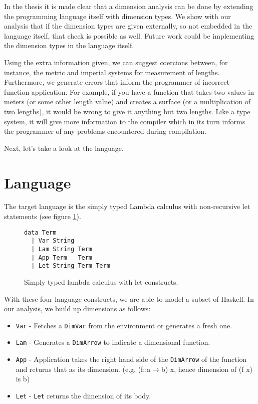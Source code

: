 \documentclass[a4paper,10pt]{article}
\begin{document}
In the thesis it is made clear that a dimension analysis can be done by extending the programming language itself with dimension types.
We show with our analysis that if the dimension types are given externally, so not embedded in the language itself, that check is possible as well.
Future work could be implementing the dimension types in the language itself.

Using the extra information given, we can suggest coercions between, for instance, the metric and imperial systems for measurement of lengths.
Furthermore, we generate errors that inform the programmer of incorrect function application. For example, if you have a function that takes two values in meters (or some other length value) and creates a surface (or a multiplication of two lengths), it would be wrong to give it anything but two lengths.
Like a type system, it will give more information to the compiler which in its turn informs the programmer of any problems encountered during compilation.

Next, let's take a look at the language.

\section{Language}\label{lang}

The target language is the simply typed Lambda calculus with non-recursive let statements (see figure \ref{datalang}). 

\begin{figure}[h]
\begin{lstlisting}
data Term
  | Var String
  | Lam String Term
  | App Term   Term
  | Let String Term Term
\end{lstlisting}
\caption{Simply typed lambda calculus with let-constructs.}\label{datalang}
\end{figure}

With these four language constructs, we are able to model a subset of Haskell.
In our analysis, we build up dimensions as follows:
\begin{itemize}
	\item \texttt{Var} - Fetches a \texttt{DimVar} from the environment or generates a fresh one.
	\item \texttt{Lam} - Generates a \texttt{DimArrow} to indicate a dimensional function.
	\item \texttt{App} - Application takes the right hand side of the \texttt{DimArrow} of the function and returns that as its dimension. (e.g. (f::a$\rightarrow$b) x, hence dimension of (f x) is b)
	\item \texttt{Let} - \texttt{Let} returns the dimension of its body.
\end{itemize}
\end{document}

